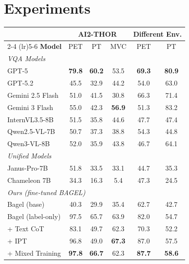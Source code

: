 \documentclass{llmxive}
\begin{document}

\section{Experiments}

\begin{table}[t]
  \vspace{-1em}
  \centering
  \setlength{\tabcolsep}{13pt}
  \begin{tabular}{l ccc cc}
    \toprule
    & \multicolumn{3}{c}{\textbf{AI2-THOR}} & \multicolumn{2}{c}{\textbf{Different Env.}} \\
    \cmidrule(lr){2-4} \cmidrule(lr){5-6}
    \textbf{Model}
      & PET & \footnotesize PT & MVC
      & \footnotesize PET & \footnotesize PT \\
    \midrule
    \multicolumn{6}{l}{\emph{VQA Models}} \\
    GPT-5            & \textbf{79.8} & \textbf{60.2} & 53.5 & \textbf{69.3} & \textbf{80.9} \\
    GPT-5.2          & 45.5 & 32.9 & 44.2 & 54.0 & 63.0 \\
    Gemini 2.5 Flash & 51.0 & 41.5 & 30.8 & 66.3 & 71.4 \\
    Gemini 3 Flash   & 55.0 & 42.3 & \textbf{56.9} & 51.3 & 83.2 \\
    InternVL3.5-8B   & 51.5 & 35.8 & 44.6 & 47.7 & 47.4 \\
    Qwen2.5-VL-7B   & 50.7 & 37.3 & 38.8 & 54.3 & 44.8 \\
    Qwen3-VL-8B     & 52.0 & 35.9 & 43.8 & 46.7 & 64.1 \\
    \midrule
    \multicolumn{6}{l}{\emph{Unified Models}} \\
    Janus-Pro-7B     & 51.8 & 33.5 & 33.1 & 44.7 & 35.3 \\
    Chameleon 7B     & 34.3 & 16.3 & 5.4 & 47.3 & 24.5 \\
    \midrule
    \multicolumn{6}{l}{\emph{Ours (fine-tuned BAGEL)}} \\
    Bagel (base)              & 40.3 & 29.9 & 35.4 & 62.7 & 42.7 \\
    Bagel (label-only)        & 97.5 & 65.7 & 63.9 & 82.0 & 54.7 \\
    + Text CoT                 & 83.1 & 49.7 & 62.3 & 70.3 & 52.2 \\
    + IPT                       & 96.8 & 49.0 & \textbf{67.3} & 87.0 & 57.5 \\
    + Mixed Training            & \textbf{97.8} & \textbf{66.7} & 62.3 & \textbf{87.7} & \textbf{58.6} \\

\end{tabular}
\end{table}
\end{document}
